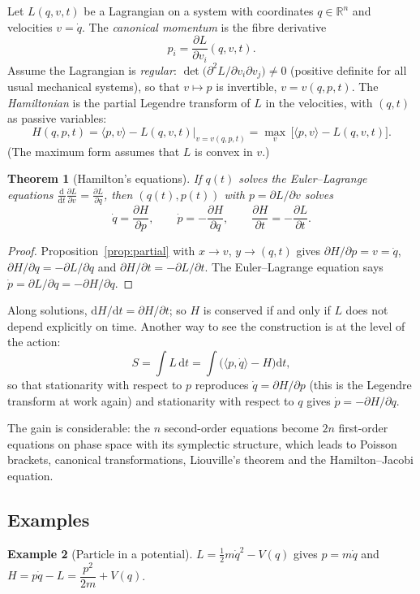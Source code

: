 \documentclass[11pt,a4paper]{article}
\newcommand{\R}{\mathbb{R}}
\newcommand{\dd}{\mathrm{d}}
\newcommand{\ip}[2]{\langle #1,#2\rangle}
\newcommand{\pder}[2]{\frac{\partial #1}{\partial #2}}
\theoremstyle{plain}
\newtheorem{theorem}{Theorem}[section]
\theoremstyle{definition}
\newtheorem{example}[theorem]{Example}
\theoremstyle{remark}
\begin{document}
Let $L(q,v,t)$ be a Lagrangian on a system with coordinates $q\in\R^n$ and
velocities $v=\dot q$.  The \emph{canonical momentum} is the fibre derivative
\[
  p_i=\pder{L}{v_i}(q,v,t).
\]
Assume the Lagrangian is \emph{regular}: $\det\bigl(\partial^2L/\partial v_i\partial v_j\bigr)\neq0$
(positive definite for all usual mechanical systems), so that $v\mapsto p$ is
invertible, $v=v(q,p,t)$.  The \emph{Hamiltonian} is the partial Legendre
transform of $L$ in the velocities, with $(q,t)$ as passive variables:
\[
  H(q,p,t)=\ip{p}{v}-L(q,v,t)\Big|_{v=v(q,p,t)}=\max_v\,\bigl[\ip{p}{v}-L(q,v,t)\bigr].
\]
(The maximum form assumes that $L$ is convex in $v$.)

\begin{theorem}[Hamilton's equations]
If $q(t)$ solves the Euler--Lagrange equations
$\frac{\dd}{\dd t}\pder{L}{v}=\pder{L}{q}$, then $(q(t),p(t))$ with
$p=\partial L/\partial v$ solves
\[
  \dot q=\pder{H}{p},\qquad \dot p=-\pder{H}{q},\qquad
  \pder{H}{t}=-\pder{L}{t}.
\]
\end{theorem}

\begin{proof}
Proposition~\ref{prop:partial} with $x\to v$, $y\to(q,t)$ gives
$\partial H/\partial p=v=\dot q$, $\partial H/\partial q=-\partial L/\partial q$
and $\partial H/\partial t=-\partial L/\partial t$.  The Euler--Lagrange equation
says $\dot p=\partial L/\partial q=-\partial H/\partial q$.
\end{proof}

Along solutions, $\dd H/\dd t=\partial H/\partial t$; so $H$ is conserved if
and only if $L$ does not depend explicitly on time.  Another way to see the
construction is at the level of the action:
\[
  S=\int L\,\dd t=\int\bigl(\ip{p}{\dot q}-H\bigr)\dd t,
\]
so that stationarity with respect to $p$ reproduces $\dot q=\partial H/\partial p$
(this is the Legendre transform at work again) and stationarity with respect
to $q$ gives $\dot p=-\partial H/\partial q$.

The gain is considerable: the $n$ second-order equations become $2n$
first-order equations on phase space with its symplectic structure, which
leads to Poisson brackets, canonical transformations, Liouville's theorem and
the Hamilton--Jacobi equation.

\subsection{Examples}

\begin{example}[Particle in a potential]
$L=\tfrac12m\dot q^2-V(q)$ gives $p=m\dot q$ and
$H=p\dot q-L=\dfrac{p^2}{2m}+V(q)$.
\end{example}
\end{document}
